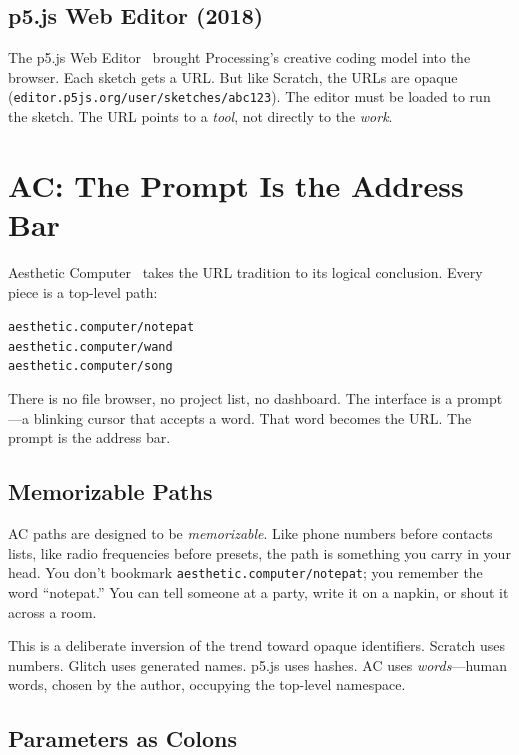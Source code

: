 \documentclass[10pt,letterpaper,twocolumn]{article}
\newcommand{\code}[1]{\texttt{#1}}
\begin{document}
\subsection{p5.js Web Editor (2018)}

The p5.js Web Editor~\citep{mccarthy2015p5js} brought Processing's creative coding model into the browser. Each sketch gets a URL. But like Scratch, the URLs are opaque (\code{editor.p5js.org/user/sketches/abc123}). The editor must be loaded to run the sketch. The URL points to a \emph{tool}, not directly to the \emph{work}.

\section{AC: The Prompt Is the Address Bar}

Aesthetic Computer~\citep{scudder2026ac} takes the URL tradition to its logical conclusion. Every piece is a top-level path:

\begin{center}
\code{aesthetic.computer/notepat}\\
\code{aesthetic.computer/wand}\\
\code{aesthetic.computer/song}
\end{center}

There is no file browser, no project list, no dashboard. The interface is a prompt---a blinking cursor that accepts a word. That word becomes the URL. The prompt is the address bar.

\subsection{Memorizable Paths}

AC paths are designed to be \emph{memorizable}. Like phone numbers before contacts lists, like radio frequencies before presets, the path is something you carry in your head. You don't bookmark \code{aesthetic.computer/notepat}; you remember the word ``notepat.'' You can tell someone at a party, write it on a napkin, or shout it across a room.

This is a deliberate inversion of the trend toward opaque identifiers. Scratch uses numbers. Glitch uses generated names. p5.js uses hashes. AC uses \emph{words}---human words, chosen by the author, occupying the top-level namespace.

\subsection{Parameters as Colons}
\end{document}

